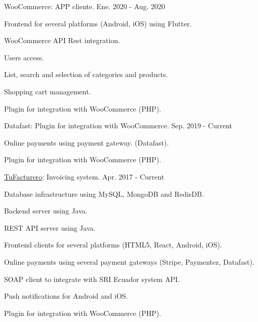 \begin{cventries}
  \cventry
    {WooCommerce: APP cliente.} %
    {} %
    {} %
    {Ene. 2020 - Aug. 2020} %
    {
      \begin{cvitems} %
        \item {Frontend for several platforms (Android, iOS) using Flutter.}
        \item {WooCommerce API Rest integration.}
        \item {Users access.}
        \item {List, search and selection of categories and products.}
        \item {Shopping cart management.}
        \item {Plugin for integration with WooCommerce (PHP).}
      \end{cvitems}
    }

  \cventry
    {Datafast: Plugin for integration with WooCommerce.} %
    {} %
    {} %
    {Sep. 2019 - Current} %
    {
      \begin{cvitems} %
        \item {Online payments using payment gateway. (Datafast).}
        \item {Plugin for integration with WooCommerce (PHP).}
      \end{cvitems}
    }

  \cventry
    {\href{https://tufacturero.ec}{TuFacturero}: Invoicing system.} %
    {} %
    {} %
    {Apr. 2017 - Current} %
    {
      \begin{cvitems} %
        \item {Database infrastructure using MySQL, MongoDB and RedisDB.}
        \item {Backend server using Java.}
        \item {REST API server using Java.}
        \item {Frontend clients for several platforms (HTML5, React, Android, iOS).}
        \item {Online payments using several payment gateways (Stripe, Paymentez, Datafast).}
        \item {SOAP client to integrate with SRI Ecuador system API.}
        \item {Push notifications for Android and iOS.}
        \item {Plugin for integration with WooCommerce (PHP).}
      \end{cvitems}
    }


\end{cventries}
